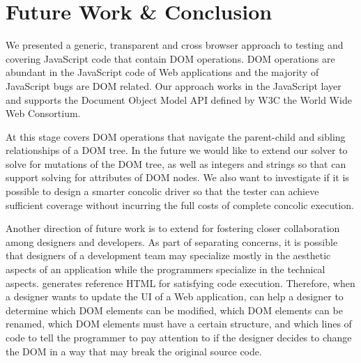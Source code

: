 \section{Future Work \& Conclusion}
We presented a generic, transparent and cross browser approach to testing and covering JavaScript code that contain DOM operations.  
DOM operations are abundant in the JavaScript code of Web applications and the majority of JavaScript bugs are DOM related.  
Our approach works in the JavaScript layer and supports the Document Object Model API defined by W3C the World Wide Web Consortium.  

At this stage \tool covers DOM operations that navigate the parent-child and sibling relationships of a DOM tree.  
In the future we would like to extend our solver to solve for mutations of the DOM tree, as well as integers and strings so that \tool can support solving for attributes of DOM nodes.    
We also want to investigate if it is possible to design a smarter concolic driver so that the tester can achieve sufficient coverage without incurring the full costs of complete concolic execution.

Another direction of future work is to extend \tool for fostering closer collaboration among designers and developers.
As part of separating concerns, it is possible that designers of a development team may specialize mostly in the aesthetic aspects of an application while the programmers specialize in the technical aspects.  
\tool generates reference HTML for satisfying code execution.
Therefore, when a designer wants to update the UI of a Web application, \tool can help a designer to determine 
which DOM elements can be modified, 
which DOM elements can be renamed, 
which DOM elements must have a certain structure, 
and which lines of code to tell the programmer to pay attention to if the designer decides to change the DOM in a way that may break the original source code.  
